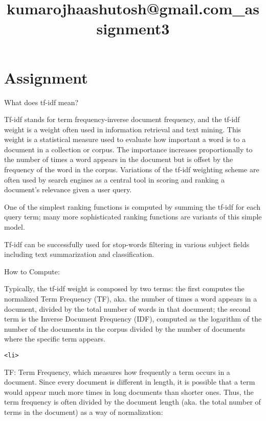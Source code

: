 \documentclass[11pt]{article}
\title{kumarojhaashutosh@gmail.com\_assignment3}
\begin{document}
    
    
    \maketitle
    
    

    
    \section{Assignment}\label{assignment}

    What does tf-idf mean?

Tf-idf stands for term frequency-inverse document frequency, and the
tf-idf weight is a weight often used in information retrieval and text
mining. This weight is a statistical measure used to evaluate how
important a word is to a document in a collection or corpus. The
importance increases proportionally to the number of times a word
appears in the document but is offset by the frequency of the word in
the corpus. Variations of the tf-idf weighting scheme are often used by
search engines as a central tool in scoring and ranking a document's
relevance given a user query.

One of the simplest ranking functions is computed by summing the tf-idf
for each query term; many more sophisticated ranking functions are
variants of this simple model.

Tf-idf can be successfully used for stop-words filtering in various
subject fields including text summarization and classification.

    How to Compute:

Typically, the tf-idf weight is composed by two terms: the first
computes the normalized Term Frequency (TF), aka. the number of times a
word appears in a document, divided by the total number of words in that
document; the second term is the Inverse Document Frequency (IDF),
computed as the logarithm of the number of the documents in the corpus
divided by the number of documents where the specific term appears.

\begin{verbatim}
<li>
\end{verbatim}

TF: Term Frequency, which measures how frequently a term occurs in a
document. Since every document is different in length, it is possible
that a term would appear much more times in long documents than shorter
ones. Thus, the term frequency is often divided by the document length
(aka. the total number of terms in the document) as a way of
normalization:
\end{document}
